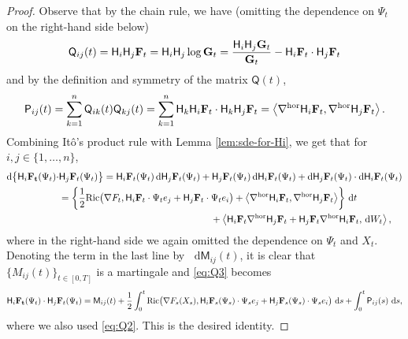 \documentclass[a4paper,twoside,11pt,reqno]{amsart}
\newcommand*\diff{\mathop{}\!\mathrm{d}}
\newcommand{\li}{\bf }
\newcommand{\MM}{\mathsf{M}}
\newcommand{\msf}{\mathsf}
\newcommand{\mr}{\mathrm}
\newcommand{\HH}{\mathsf{H}}
\begin{document}
\begin{proof}
Observe that by the chain rule, we have (omitting the dependence on $\Psi_t$ on the right-hand side below)
\begin{equation} \label{eq:Q1}
\msf{Q}_{ij}(t) = \HH_i\HH_j {\li F}_t =  \HH_i\HH_j \log{\li G}_t = \frac{\HH_i\HH_j {\li G}_t}{{\li G}_t} - \HH_i {\li F}_t\cdot \HH_j{\li F}_t
\end{equation}
and by the definition and symmetry of the matrix $\msf{Q}(t)$,
\begin{equation} \label{eq:Q2}
\msf{P}_{ij}(t) = \sum_{k=1}^n \msf{Q}_{ik}(t) \msf{Q}_{kj}(t) = \sum_{k=1}^n \HH_k \HH_i {\li F}_t \cdot \HH_k\HH_j {\li F}_t = \left\langle \nabla^{\mr{hor}} \HH_i {\li F}_t, \nabla^{\mr{hor}}\HH_j{\li F}_t\right\rangle.
\end{equation}
Combining It\^o's product rule with Lemma \ref{lem:sde-for-Hi}, we get that for $i,j\in\{1,\ldots,n\}$,
\begin{equation} \label{eq:Q3}
\begin{split}
\diff\big\{ \HH_i{\li F_t}(\Psi_t) \cdot &\HH_j{\li F}_t(\Psi_t)\big\}  = \HH_i {\li F}_t(\Psi_t) \diff \HH_j {\li F}_t(\Psi_t) + \HH_j {\li F}_t(\Psi_t) \diff \HH_i {\li F}_t(\Psi_t) + \diff\HH_j {\li F}_t(\Psi_t) \cdot \diff \HH_i {\li F}_t(\Psi_t)
\\ & = \left\{ \frac{1}{2}\mr{Ric}\big( \nabla F_t, \HH_i {\li F}_t \cdot \Psi_t e_j + \HH_j {\li F}_t \cdot \Psi_te_i \big) + \left\langle \nabla^{\mr{hor}} \HH_i {\li F}_t, \nabla^{\mr{hor}}\HH_j{\li F}_t\right\rangle \right\}\,\diff t
\\ & \qquad \qquad \qquad \qquad \qquad \qquad  \qquad \quad \quad +  \left\langle \HH_i{\li F}_t \nabla^{\mr{hor}}\HH_j{\li F}_t + \HH_j {\li F}_t \nabla^{\mr{hor}}\HH_i{\li F}_t, \,\diff W_t\right\rangle,
\end{split}
\end{equation}
where in the right-hand side we again omitted the dependence on $\Psi_t$ and $X_t$. Denoting the term in the last line by $\diff \MM_{ij}(t)$, it is clear that $\{M_{ij}(t)\}_{t\in[0,T]}$ is a martingale and \eqref{eq:Q3} becomes
\begin{equation*} \label{eq:Q4}
\HH_i{\li F_t}(\Psi_t) \cdot \HH_j{\li F}_t(\Psi_t) = \MM_{ij}(t) +\frac{1}{2} \int_0^t \mr{Ric}\big( \nabla F_s(X_s), \HH_i {\li F}_s(\Psi_s) \cdot \Psi_s e_j + \HH_j {\li F}_s(\Psi_s) \cdot \Psi_s e_i \big)\, \diff s + \int_0^t \msf{P}_{ij}(s) \, \diff s,
\end{equation*}
where we also used \eqref{eq:Q2}. This is the desired identity.
\end{proof}
\end{document}
